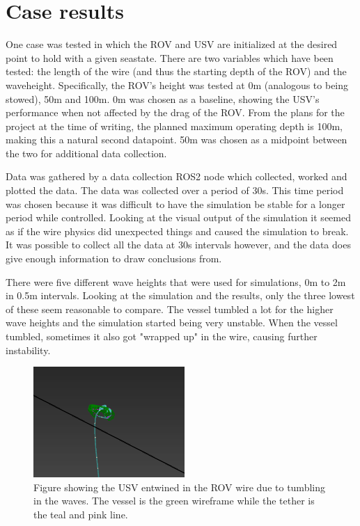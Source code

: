 \documentclass[class=article, crop=false]{standalone}
\begin{document}
\section{Case results}
\label{sec:case}
One case was tested in which the ROV and USV are initialized at the desired point to hold with a given seastate. There are two variables which have been tested: the length of the wire (and thus the starting depth of the ROV) and the waveheight. Specifically, the ROV's height was tested at 0m (analogous to being stowed), 50m and 100m. 0m was chosen as a baseline, showing the USV's performance when not affected by the drag of the ROV. From the plans for the project at the time of writing, the planned maximum operating depth is 100m, making this a natural second datapoint. 50m was chosen as a midpoint between the two for additional data collection.

Data was gathered by a data collection ROS2 node which collected, worked and plotted the data. The data was collected over a period of 30s. This time period was chosen because it was difficult to have the simulation be stable for a longer period while controlled. Looking at the visual output of the simulation it seemed as if the wire physics did unexpected things and caused the simulation to break. It was possible to collect all the data at 30s intervals however, and the data does give enough information to draw conclusions from.

There were five different wave heights that were used for simulations, 0m to 2m in 0.5m intervals. Looking at the simulation and the results, only the three lowest of these seem reasonable to compare. The vessel tumbled a lot for the higher wave heights and the simulation started being very unstable. When the vessel tumbled, sometimes it also got "wrapped up" in the wire, causing further instability.

\begin{figure}[h]
    \centering
    \includegraphics{entwined}
    \caption{Figure showing the USV entwined in the ROV wire due to tumbling in the waves. The vessel is the green wireframe while the tether is the teal and pink line.}
    \label{fig:entwined}
\end{figure}
\end{document}
